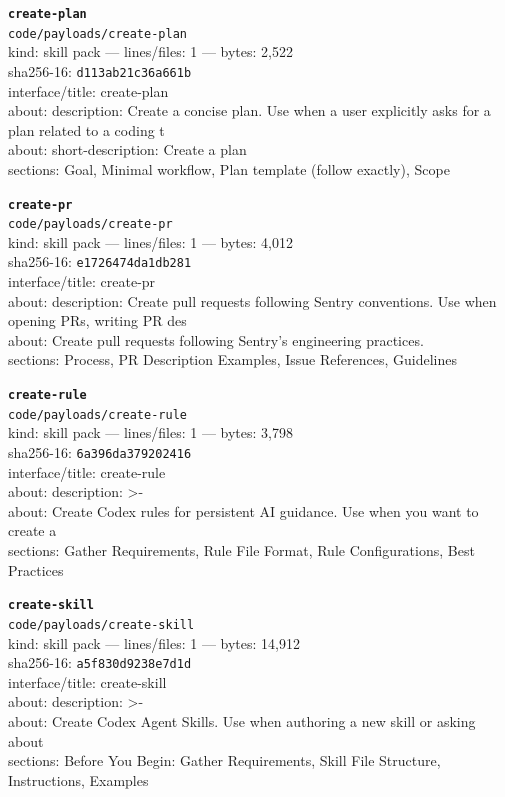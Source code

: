 \noindent\textbf{\texttt{create-plan}}\\
\texttt{code/payloads/create-plan}\\
kind: skill pack --- lines/files: 1 --- bytes: 2,522\\
sha256-16: \texttt{d113ab21c36a661b}\\
interface/title: create-plan\\
about: description: Create a concise plan. Use when a user explicitly asks for a plan related to a coding t\\
about: short-description: Create a plan\\
sections: Goal, Minimal workflow, Plan template (follow exactly), Scope\\
\vspace*{6.0pt}

\noindent\textbf{\texttt{create-pr}}\\
\texttt{code/payloads/create-pr}\\
kind: skill pack --- lines/files: 1 --- bytes: 4,012\\
sha256-16: \texttt{e1726474da1db281}\\
interface/title: create-pr\\
about: description: Create pull requests following Sentry conventions. Use when opening PRs, writing PR des\\
about: Create pull requests following Sentry's engineering practices.\\
sections: Process, PR Description Examples, Issue References, Guidelines\\
\vspace*{6.0pt}

\noindent\textbf{\texttt{create-rule}}\\
\texttt{code/payloads/create-rule}\\
kind: skill pack --- lines/files: 1 --- bytes: 3,798\\
sha256-16: \texttt{6a396da379202416}\\
interface/title: create-rule\\
about: description: >-\\
about: Create Codex rules for persistent AI guidance. Use when you want to create a\\
sections: Gather Requirements, Rule File Format, Rule Configurations, Best Practices\\
\vspace*{6.0pt}

\noindent\textbf{\texttt{create-skill}}\\
\texttt{code/payloads/create-skill}\\
kind: skill pack --- lines/files: 1 --- bytes: 14,912\\
sha256-16: \texttt{a5f830d9238e7d1d}\\
interface/title: create-skill\\
about: description: >-\\
about: Create Codex Agent Skills. Use when authoring a new skill or asking about\\
sections: Before You Begin: Gather Requirements, Skill File Structure, Instructions, Examples\\
\vspace*{6.0pt}
\newpage

